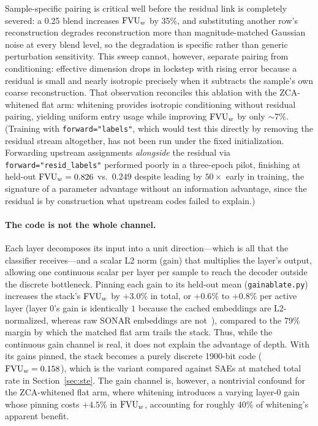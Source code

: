 Sample-specific pairing is critical well before the residual link is
completely severed: a 0.25 blend increases $\mathrm{FVU}_w$ by 35\%, and
substituting another row's reconstruction degrades reconstruction more
than magnitude-matched Gaussian noise at every blend level, so
the degradation is specific rather than generic perturbation
sensitivity. This sweep cannot, however, separate pairing from
conditioning: effective dimension drops in lockstep with rising error
because a residual is small and nearly isotropic precisely when it
subtracts the sample's own coarse reconstruction. That observation
reconciles this ablation with the ZCA-whitened flat arm: whitening
provides isotropic conditioning without residual pairing, yielding uniform
entry usage while improving $\mathrm{FVU}_w$ by only ${\sim}7\%$. (Training with
\texttt{forward="labels"}, which would test this directly by removing the
residual stream altogether, has not been run under the fixed
initialization. Forwarding upstream assignments \emph{alongside} the
residual via \texttt{forward="resid\_labels"} performed poorly in a
three-epoch pilot, finishing at held-out $\mathrm{FVU}_w = 0.826$ vs.\ $0.249$
despite leading by $50\times$ early in training, the signature of a
parameter advantage without an information advantage, since the residual
is by construction what upstream codes failed to explain.)

\paragraph{The code is not the whole channel.} Each layer decomposes its
input into a unit direction---which is all that the classifier
receives---and a scalar L2 norm (gain) that multiplies the layer's output,
allowing one continuous scalar per layer per sample to reach the decoder
outside the discrete bottleneck. Pinning each gain to its held-out mean
(\texttt{gainablate.py}) increases the stack's $\mathrm{FVU}_w$ by $+3.0\%$ in
total, or $+0.6\%$ to $+0.8\%$ per active layer (layer 0's gain is
identically $1$ because the cached embeddings are L2-normalized, whereas
raw SONAR embeddings are not~\cite{sonar}), compared to the 79\% margin
by which the matched flat arm trails the stack. Thus, while the continuous
gain channel is real, it does not explain the advantage of depth. With
its gains pinned, the stack becomes a purely discrete 1900-bit code
($\mathrm{FVU}_w = 0.158$), which is the variant compared against SAEs at matched
total rate in Section~\ref{sec:ste}. The gain channel is, however, a
nontrivial confound for the ZCA-whitened flat arm, where whitening
introduces a varying layer-0 gain whose pinning costs $+4.5\%$ in
$\mathrm{FVU}_w$, accounting for roughly 40\% of whitening's apparent benefit.

